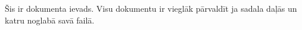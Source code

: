 Šis ir dokumenta ievads.
Visu dokumentu ir vieglāk pārvaldīt ja sadala daļās un katru noglabā savā failā.

